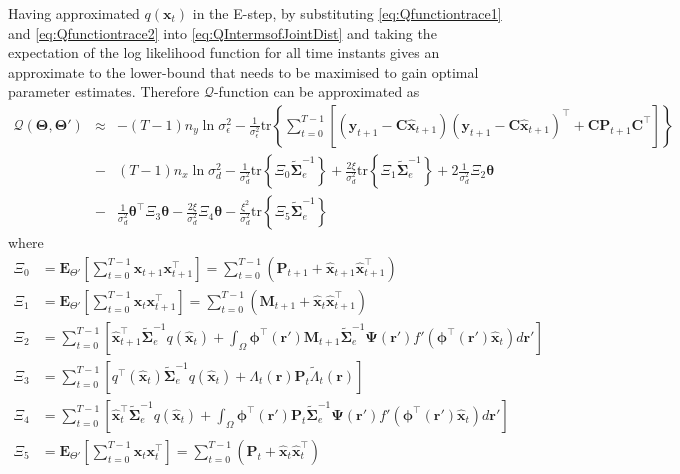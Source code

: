 \documentclass[]{article}
\begin{document}
Having approximated $q\left(\mathbf x_t\right)$ in the E-step, by substituting  \ref{eq:Qfunctiontrace1} and \ref{eq:Qfunctiontrace2} into \ref{eq:QIntermsofJointDist} and taking the expectation of the log likelihood function for all time instants gives an approximate to the lower-bound that needs to be maximised to gain optimal parameter estimates. Therefore $\mathcal Q$-function can be approximated as  
\begin{eqnarray}\label{eq:Voldermont}
 \mathcal Q(\boldsymbol \Theta,\boldsymbol\Theta')&\approx& -(T-1)n_y\ln \sigma_{\epsilon}^2-\frac{1}{\sigma_{\epsilon}^2}\mathrm{tr}\left\lbrace\boldsymbol\sum_{t=0}^{T-1}\left[ (\mathbf y_{t+1}-\mathbf C\mathbf{\hat{x}}_{t+1}) (\mathbf y_{t+1}-\mathbf C\mathbf{\hat{x}}_{t+1})^\top+\mathbf C \mathbf P_{t+1}\mathbf C^\top\right] \right\rbrace\nonumber \\
&-&(T-1)n_x\ln\sigma_d^2-\frac{1}{\sigma_d^2}\mathrm{tr}\left\lbrace \Xi_{0} \tilde{\boldsymbol\Sigma}_e^{-1}\right\rbrace +\frac{2\xi}{\sigma_d^2} \mathrm{tr}\left\lbrace \Xi_{1} \tilde{\boldsymbol\Sigma}_e^{-1}\right\rbrace+2\frac{1}{\sigma_d^2}\Xi_{2}\boldsymbol\theta
 \nonumber \\
&-&\frac{1}{\sigma_d^2}\boldsymbol\theta^\top \Xi_{3}\boldsymbol\theta-\frac{2\xi}{\sigma_d^2} \Xi_{4} \boldsymbol\theta -  \frac{\xi^2}{\sigma_d^2}\mathrm{tr} \left\lbrace\Xi_{5}\tilde{\boldsymbol\Sigma}_e^{-1} \right\rbrace 
\end{eqnarray}
where 
\begin{align}
	\Xi_{0}&=\mathbf E_{\Theta'}\left[\sum_{t=0}^{T-1}\mathbf x_{t+1}\mathbf x_{t+1}^\top\right]=\sum_{t=0}^{T-1}\left(\mathbf P_{t+1}+\mathbf{\hat x}_{t+1}\mathbf{\hat x}_{t+1}^\top\right)\label{eq:defofXi0} \\
\Xi_{1}&=\mathbf E_{\Theta'}\left[\sum_{t=0}^{T-1}\mathbf x_t\mathbf x_{t+1}^\top\right]=\sum_{t=0}^{T-1}\left(\mathbf M_{t+1}+\mathbf{\hat x}_t\mathbf{\hat x}_{t+1}^\top\right) \label{eq:defofXi1} \\
\Xi_{2}&=\sum_{t=0}^{T-1}\left[ \mathbf{\hat x}_{t+1}^\top\tilde{\boldsymbol\Sigma}_e^{-1}q(\mathbf{\hat x}_t)+\int_\Omega\boldsymbol \phi^\top(\mathbf r') \mathbf M_{t+1} \tilde{\boldsymbol\Sigma}_e^{-1} \boldsymbol{\Psi}(\mathbf{r}') f'(\boldsymbol \phi^\top(\mathbf r')\mathbf {\hat x}_t) d\mathbf{r}'\right] \\	
\Xi_{3}&=\sum_{t=0}^{T-1}\left[q^\top(\mathbf{\hat x}_t)\tilde{\boldsymbol\Sigma}_e^{-1}q(\mathbf{\hat x}_t)+\Lambda_t(\mathbf r)\mathbf P_t \tilde{\Lambda}_t(\mathbf r)\right] \\
 \Xi_{4}&=\sum_{t=0}^{T-1}\left[ \mathbf{\hat x}_{t}^\top\tilde{\boldsymbol\Sigma}_e^{-1}q(\mathbf{\hat x}_t)+\int_\Omega\boldsymbol \phi^\top(\mathbf r') \mathbf P_t \tilde{\boldsymbol\Sigma}_e^{-1}  \boldsymbol{\Psi}(\mathbf{r}') f'(\boldsymbol \phi^\top(\mathbf r')\mathbf {\hat x}_t) d\mathbf{r}'\right] \\
 \Xi_{5}&=\mathbf E_{\Theta'}\left[\sum_{t=0}^{T-1}\mathbf x_t\mathbf x_{t}^\top\right]=\sum_{t=0}^{T-1}\left(\mathbf P_t+\mathbf{\hat x}_t\mathbf{\hat x}_t^\top\right)
\end{align}
\end{document}
